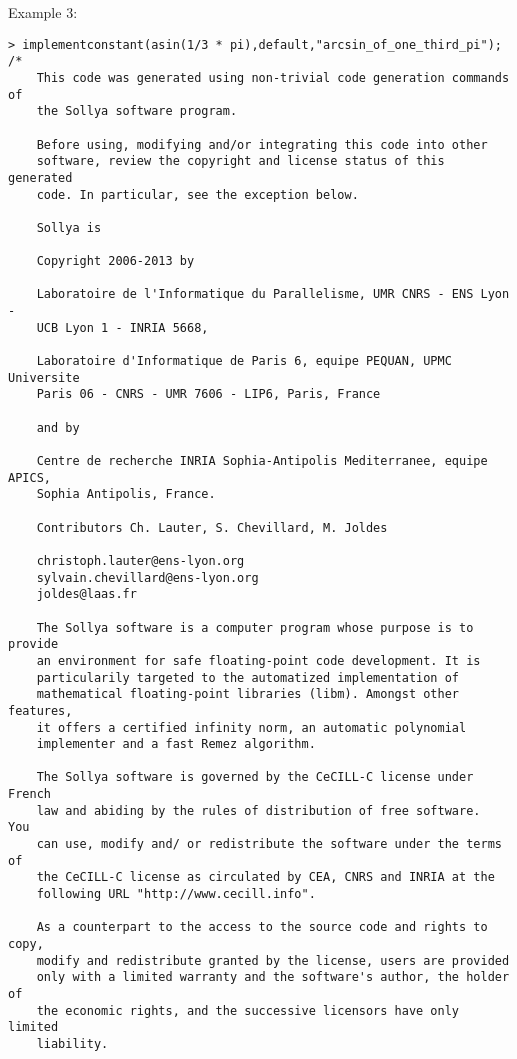 \noindent Example 3: 
\begin{center}\begin{minipage}{15cm}\begin{Verbatim}[frame=single]
> implementconstant(asin(1/3 * pi),default,"arcsin_of_one_third_pi");
/*
    This code was generated using non-trivial code generation commands of
    the Sollya software program.
    
    Before using, modifying and/or integrating this code into other
    software, review the copyright and license status of this generated
    code. In particular, see the exception below.
    
    Sollya is
    
    Copyright 2006-2013 by
    
    Laboratoire de l'Informatique du Parallelisme, UMR CNRS - ENS Lyon -
    UCB Lyon 1 - INRIA 5668,
    
    Laboratoire d'Informatique de Paris 6, equipe PEQUAN, UPMC Universite
    Paris 06 - CNRS - UMR 7606 - LIP6, Paris, France
    
    and by
    
    Centre de recherche INRIA Sophia-Antipolis Mediterranee, equipe APICS,
    Sophia Antipolis, France.
    
    Contributors Ch. Lauter, S. Chevillard, M. Joldes
    
    christoph.lauter@ens-lyon.org
    sylvain.chevillard@ens-lyon.org
    joldes@laas.fr
    
    The Sollya software is a computer program whose purpose is to provide
    an environment for safe floating-point code development. It is
    particularily targeted to the automatized implementation of
    mathematical floating-point libraries (libm). Amongst other features,
    it offers a certified infinity norm, an automatic polynomial
    implementer and a fast Remez algorithm.
    
    The Sollya software is governed by the CeCILL-C license under French
    law and abiding by the rules of distribution of free software.  You
    can use, modify and/ or redistribute the software under the terms of
    the CeCILL-C license as circulated by CEA, CNRS and INRIA at the
    following URL "http://www.cecill.info".
    
    As a counterpart to the access to the source code and rights to copy,
    modify and redistribute granted by the license, users are provided
    only with a limited warranty and the software's author, the holder of
    the economic rights, and the successive licensors have only limited
    liability.
    

\end{Verbatim}
\end{minipage}
\end{center}
